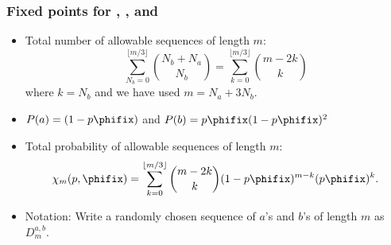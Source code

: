 \begin{frame}
  \frametitle{Fixed points for , , and }

  \begin{itemize}
  \item<1->
    Total number of allowable sequences of length $m$:
    $$
    \sum_{N_b=0}^{\lfloor m/3\rfloor}
    \binom{N_b+N_a}{N_b}
    = 
    \sum_{k=0}^{\lfloor m/3\rfloor}
    \binom{m-2k}{k}
    $$
    where $k=N_b$ and we have used $m = N_a + 3N_b$.
  \item<2->
    $P(a) = (1-p\phifix)$ and $P(b) = p\phifix(1-p\phifix)^2$
  \item<3->
    Total probability of allowable sequences of length $m$:
    $$
    \chi_m(p,\phifix)
    = 
    \sum_{k=0}^{\lfloor m/3\rfloor}
    \binom{m-2k}{k}
    (1-p\phifix)^{m-k}
    (p\phifix)^k.
    $$
  \item<4->
    Notation: Write a randomly chosen 
    sequence of $a$'s and $b$'s of length $m$
    as $D_{m}^{a,b}$.
  \end{itemize}

\end{frame}

